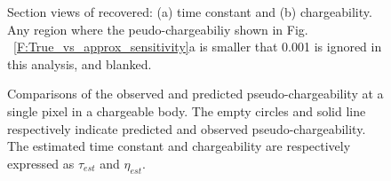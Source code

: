 \documentclass[extra,mreferee]{gji}
\begin{document}
\begin{figure}
  \caption{Section views of recovered: (a) time constant and (b) chargeability. Any region where the peudo-chargeabiliy shown in Fig. ~\ref{F:True_vs_approx_sensitivity}a is smaller that 0.001 is ignored in this analysis, and blanked.}
  \label{F:EtaTauSection}
\end{figure}

\begin{figure}
  \caption{Comparisons of the observed and predicted pseudo-chargeability at a single pixel in a chargeable body. 
  The empty circles and solid line respectively indicate predicted and observed pseudo-chargeability. The estimated time constant and chargeability are respectively expressed as $\tau_{est}$ and $\eta_{est}$.}
  \label{F:IntrinsicIP}
\end{figure}

\clearpage

\appendix
\end{document}
